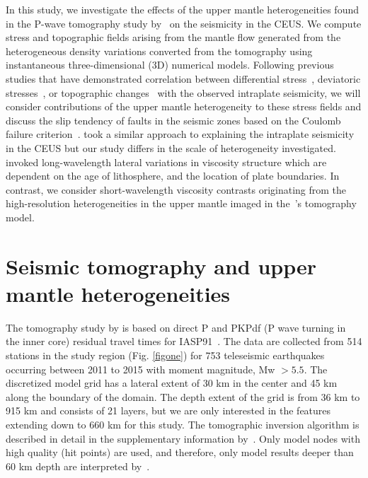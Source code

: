 \documentclass[draft,linenumbers]{agujournal2018}
\begin{document}
In this study, we investigate the effects of the upper mantle heterogeneities found in the P-wave tomography study by~\citet{Biryol_2016} on the seismicity in the CEUS. We compute stress and topographic fields  arising from the mantle flow generated from the heterogeneous density variations converted from the tomography using instantaneous three-dimensional (3D) numerical models. %
Following previous studies that have demonstrated correlation between differential stress~\citep[e.g.,][]{baird2010relationship, zhan2016stress},  deviatoric stresses~\citep[e.g.,][]{levandowski2016dense}, or topographic changes~\citep{becker2015western} with the observed intraplate seismicity, 
we will consider contributions of the upper mantle heterogeneity to these stress fields and discuss the slip tendency of faults in the seismic zones based on the Coulomb failure criterion~\citep[e.g.,][]{king1994static, freed2005earthquake, li2007stress}. \citet{ghosh2019role} took a similar approach to explaining the intraplate seismicity in the CEUS but our study differs in the scale of heterogeneity investigated. \citet{ghosh2019role} invoked long-wavelength lateral variations in viscosity structure  which are dependent on the age of lithosphere, and the location of plate boundaries. In contrast, we consider short-wavelength viscosity contrasts originating from the high-resolution heterogeneities in the upper mantle imaged in the~\citet{Biryol_2016}\rq{}s tomography model. 


\section{Seismic tomography and upper mantle heterogeneities}

The tomography study by \citet{Biryol_2016} is based on direct P and PKPdf (P wave turning in the inner core) residual travel times for IASP91~\citep{kennett1991traveltimes}. The data are collected from 514 stations in the study region (Fig. \ref{figone}) for 753 teleseismic earthquakes occurring between 2011 to 2015 with moment magnitude, Mw $> 5.5$. The discretized model grid has a lateral extent of 30 km in the center and 45 km along the boundary of the domain. The depth extent of the grid is from 36 km to 915 km and consists of 21 layers, but we are only interested in the features extending down to 660 km for this study. The tomographic inversion algorithm is described in detail in the supplementary information by~\citet{Biryol_2016}. Only model nodes with high quality (hit points) are used, and therefore, only model results deeper than 60 km depth are interpreted by~\citet{Biryol_2016}.
    
\end{document}
